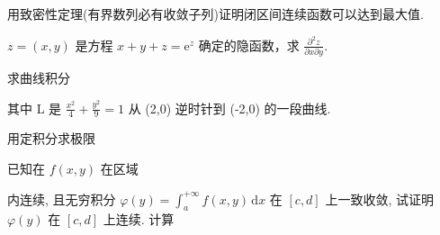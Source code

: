 \par{}
用致密性定理(有界数列必有收敛子列)证明闭区间连续函数可以达到最大值.\par
\par{}
$z = (x,y)$ 是方程 $x + y + z = \mathrm{e}^z$ 确定的隐函数，求 $\frac{\partial^2z}{\partial x\partial y}$.\par
\par{}
\par{}
求曲线积分\par
\nopagebreak[4]
其中 L 是  $\frac{x^{2}}{4} + \frac{y^{2}}{9} = 1$  从 (2,0) 逆时针到 (-2,0) 的一段曲线.\par
\par{}
\par{}
用定积分求极限\par
\nopagebreak[4]
\par{}
\par{}
已知在 $f(x, y)$ 在区域\par
\nopagebreak[4]
\par{}
内连续, 且无穷积分 $\varphi(y) = \int_{a}^{+\infty} f(x, y) \, \mathrm{d}x$ 在 $[c, d]$ 上一致收敛, 试证明 $\varphi(y)$ 在 $[c, d]$ 上连续.
计算\par
\nopagebreak[4]

